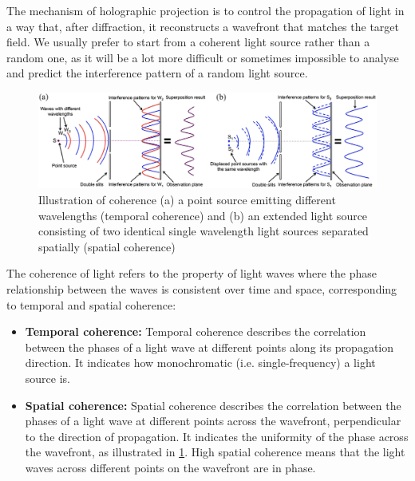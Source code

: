 The mechanism of holographic projection is to control the propagation of light in a way that, after diffraction, it reconstructs a wavefront that matches the target field. We usually prefer to start from a coherent light source rather than a random one, as it will be a lot more difficult or sometimes impossible to analyse and predict the interference pattern of a random light source.

\begin{figure}[H]
	\centering
	\includegraphics[width=1.0\textwidth]{coherent-vs-incoherent.png}
	\caption{Illustration of coherence (a) a point source emitting different wavelengths (temporal coherence) and (b) an extended light source consisting of two identical single wavelength light sources separated spatially (spatial coherence) \cite{Deng2017}}
	\label{fig:coherent-vs-incoherent.eps}
\end{figure}

The coherence of light refers to the property of light waves where the phase relationship between the waves is consistent over time and space, corresponding to temporal and spatial coherence:
\begin{itemize}
  \item \textbf{Temporal coherence:} Temporal coherence describes the correlation between the phases of a light wave at different points along its propagation direction. It indicates how monochromatic (i.e. single-frequency) a light source is.
  \item \textbf{Spatial coherence:} Spatial coherence describes the correlation between the phases of a light wave at different points across the wavefront, perpendicular to the direction of propagation. It indicates the uniformity of the phase across the wavefront, as illustrated in \cref{fig:coherent-vs-incoherent.eps}. High spatial coherence means that the light waves across different points on the wavefront are in phase.
\end{itemize}

